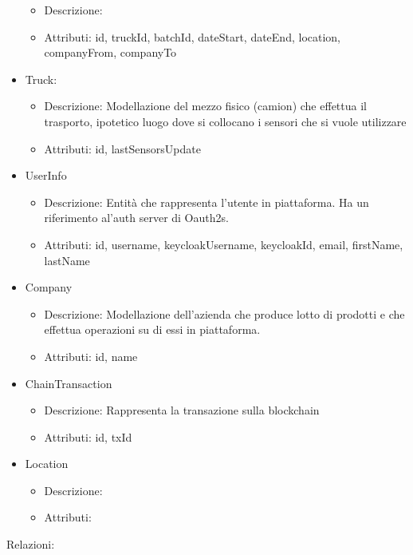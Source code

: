 \documentclass[a4paper,11pt]{article}
\begin{document}
\begin{itemize}
\begin{itemize}
          \item Descrizione:
          \item Attributi: id, truckId, batchId, dateStart, dateEnd, location, companyFrom, companyTo
        \end{itemize}
  \item Truck:
        \begin{itemize}
          \item Descrizione: Modellazione del mezzo fisico (camion) che effettua il trasporto, ipotetico luogo dove si collocano i sensori che si vuole utilizzare
          \item Attributi: id, lastSensorsUpdate
        \end{itemize}
  \item UserInfo
        \begin{itemize}
          \item Descrizione: Entità che rappresenta l'utente in piattaforma. Ha un riferimento al'auth server di Oauth2s.
          \item Attributi: id, username, keycloakUsername, keycloakId, email, firstName, lastName
        \end{itemize}
  \item Company
        \begin{itemize}
          \item Descrizione: Modellazione dell'azienda che produce lotto di prodotti e che effettua operazioni su di essi in piattaforma.
          \item Attributi: id, name
        \end{itemize}
  \item ChainTransaction
        \begin{itemize}
          \item Descrizione: Rappresenta la transazione sulla blockchain
          \item Attributi: id, txId
        \end{itemize}
  \item Location
        \begin{itemize}
          \item Descrizione:
          \item Attributi:
        \end{itemize}
\end{itemize}

Relazioni:
\end{document}

